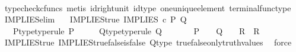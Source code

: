 \begin{isabellebody}
\ \ \ \ \isamarkupfalse%
\ {\isacharparenleft}{\kern0pt}typecheck{\isacharunderscore}{\kern0pt}cfuncs{\isacharcomma}{\kern0pt}\ metis\ id{\isacharunderscore}{\kern0pt}right{\isacharunderscore}{\kern0pt}unit{}\ id{\isacharunderscore}{\kern0pt}type\ one{\isacharunderscore}{\kern0pt}unique{\isacharunderscore}{\kern0pt}element\ terminal{\isacharunderscore}{\kern0pt}func{\isacharunderscore}{\kern0pt}type{\isacharparenright}{\kern0pt}\isanewline
{}\isamarkupfalse%
%
\endisatagproof
{\isafoldproof}%
%
\isadelimproof
\isanewline
%
\endisadelimproof
\isanewline
{}\isamarkupfalse%
\ IMPLIES{\isacharunderscore}{\kern0pt}elim{\isacharprime}{\kern0pt}{\isacharcolon}{\kern0pt}\isanewline
\ \ \ IMPLIES{\isacharunderscore}{\kern0pt}true{\isacharcolon}{\kern0pt}\ {\isachardoublequoteopen}IMPLIES\ {\isasymcirc}\isactrlsub c\ {\isasymlangle}P{\isacharcomma}{\kern0pt}\ Q{\isasymrangle}\ {\isacharequal}{\kern0pt}\ {\isasymt}{\isachardoublequoteclose}\isanewline
\ \ \ P{\isacharunderscore}{\kern0pt}type{\isacharbrackleft}{\kern0pt}type{\isacharunderscore}{\kern0pt}rule{\isacharbrackright}{\kern0pt}{\isacharcolon}{\kern0pt}\ {\isachardoublequoteopen}P\ {\isacharcolon}{\kern0pt}\ {\isasymone}\ {\isasymrightarrow}\ {\isasymOmega}{\isachardoublequoteclose}\ \ Q{\isacharunderscore}{\kern0pt}type{\isacharbrackleft}{\kern0pt}type{\isacharunderscore}{\kern0pt}rule{\isacharbrackright}{\kern0pt}{\isacharcolon}{\kern0pt}\ {\isachardoublequoteopen}Q\ {\isacharcolon}{\kern0pt}\ {\isasymone}\ {\isasymrightarrow}\ {\isasymOmega}{\isachardoublequoteclose}\isanewline
\ \ \ {\isachardoublequoteopen}{\isacharparenleft}{\kern0pt}P\ {\isacharequal}{\kern0pt}\ {\isasymt}{\isacharparenright}{\kern0pt}\ {\isasymLongrightarrow}\ {\isacharparenleft}{\kern0pt}{\isacharparenleft}{\kern0pt}Q\ {\isacharequal}{\kern0pt}\ {\isasymt}{\isacharparenright}{\kern0pt}\ {\isasymLongrightarrow}\ R{\isacharparenright}{\kern0pt}\ {\isasymLongrightarrow}\ R{\isachardoublequoteclose}\isanewline
%
\isadelimproof
\ \ %
\endisadelimproof
%
\isatagproof
{}\isamarkupfalse%
\ IMPLIES{\isacharunderscore}{\kern0pt}true\ IMPLIES{\isacharunderscore}{\kern0pt}true{\isacharunderscore}{\kern0pt}false{\isacharunderscore}{\kern0pt}is{\isacharunderscore}{\kern0pt}false\ Q{\isacharunderscore}{\kern0pt}type\ true{\isacharunderscore}{\kern0pt}false{\isacharunderscore}{\kern0pt}only{\isacharunderscore}{\kern0pt}truth{\isacharunderscore}{\kern0pt}values\ \isamarkupfalse%
\ force%

\end{isabellebody}
